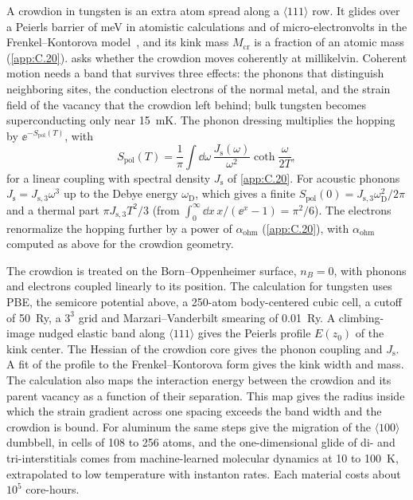 A crowdion in tungsten is an extra atom spread along a $\langle111\rangle$ row. It glides over a Peierls barrier of meV in atomistic calculations and of micro-electronvolts in the Frenkel--Kontorova model~\cite{fitzgerald2018structure}, and its kink mass $M_{\mathrm{cr}}$ is a fraction of an atomic mass (\cref{app:C.20}).  asks whether the crowdion moves coherently at millikelvin. Coherent motion needs a band that survives three effects: the phonons that distinguish neighboring sites, the conduction electrons of the normal metal, and the strain field of the vacancy that the crowdion left behind; bulk tungsten becomes superconducting only near \SI{15}{mK}. The phonon dressing multiplies the hopping by $\ee^{-S_{\mathrm{pol}}(T)}$, with
\begin{equation}
  S_{\mathrm{pol}}(T) = \frac{1}{\pi}\int\dd\omega\,\frac{J_{\mathrm{s}}(\omega)}{\omega^2}\coth\frac{\omega}{2T} ,
  \label{eq:E.22-Spol}
\end{equation}
for a linear coupling with spectral density $J_{\mathrm{s}}$ of \cref{app:C.20}. For acoustic phonons $J_{\mathrm{s}} = J_{\mathrm{s},3}\omega^3$ up to the Debye energy $\omega_{\mathrm{D}}$, which gives a finite $S_{\mathrm{pol}}(0) = J_{\mathrm{s},3}\omega_{\mathrm{D}}^2/2\pi$ and a thermal part $\pi J_{\mathrm{s},3}T^2/3$ (from $\int_0^\infty\dd x\,x/(\ee^x - 1) = \pi^2/6$). The electrons renormalize the hopping further by a power of $\alpha_{\mathrm{ohm}}$ (\cref{app:C.20}), with $\alpha_{\mathrm{ohm}}$ computed as above for the crowdion geometry.

The crowdion is treated on the Born--Oppenheimer surface, $n_B = 0$, with phonons and electrons coupled linearly to its position. The calculation for tungsten uses PBE, the semicore potential above, a 250-atom body-centered cubic cell, a cutoff of \SI{50}{Ry}, a $3^3$ grid and Marzari--Vanderbilt smearing of \SI{0.01}{Ry}. A climbing-image nudged elastic band along $\langle111\rangle$ gives the Peierls profile $E(z_0)$ of the kink center. The Hessian of the crowdion core gives the phonon coupling and $J_{\mathrm{s}}$. A fit of the profile to the Frenkel--Kontorova form gives the kink width and mass. The calculation also maps the interaction energy between the crowdion and its parent vacancy as a function of their separation. This map gives the radius inside which the strain gradient across one spacing exceeds the band width and the crowdion is bound. For aluminum the same steps give the migration of the $\langle100\rangle$ dumbbell, in cells of 108 to 256 atoms, and the one-dimensional glide of di- and tri-interstitials comes from machine-learned molecular dynamics at 10 to \SI{100}{K}, extrapolated to low temperature with instanton rates. Each material costs about $10^5$ core-hours.

